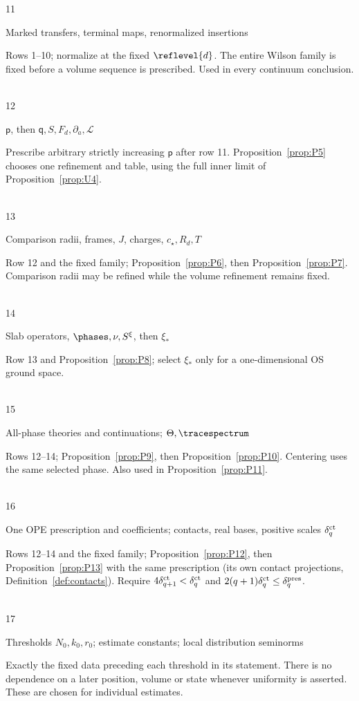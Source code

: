 \begin{tabbing}
11\>\parbox[t]{0.26\linewidth}{\raggedright Marked transfers, terminal maps, renormalized insertions}\>\parbox[t]{0.67\linewidth}{\raggedright Rows 1--10; normalize at the fixed $\reflevel{d}$. The entire Wilson family is fixed before a volume sequence is prescribed. Used in every continuum conclusion.}\\[0.45em]
12\>\parbox[t]{0.26\linewidth}{\raggedright $\mathsf p$, then $\mathsf q,S,F_d,\partial_a,\mathcal L$}\>\parbox[t]{0.67\linewidth}{\raggedright Prescribe arbitrary strictly increasing $\mathsf p$ after row 11. Proposition~\ref{prop:P5} chooses one refinement and table, using the full inner limit of Proposition~\ref{prop:U4}.}\\[0.45em]
13\>\parbox[t]{0.26\linewidth}{\raggedright Comparison radii, frames, $J$, charges, $c_\star,R_d,T$}\>\parbox[t]{0.67\linewidth}{\raggedright Row 12 and the fixed family; Proposition~\ref{prop:P6}, then Proposition~\ref{prop:P7}. Comparison radii may be refined while the volume refinement remains fixed.}\\[0.45em]
14\>\parbox[t]{0.26\linewidth}{\raggedright Slab operators, $\phases,\nu,S^\xi$, then $\xi_*$}\>\parbox[t]{0.67\linewidth}{\raggedright Row 13 and Proposition~\ref{prop:P8}; select $\xi_*$ only for a one-dimensional OS ground space.}\\[0.45em]
15\>\parbox[t]{0.26\linewidth}{\raggedright All-phase theories and continuations; $\Theta,\tracespectrum$}\>\parbox[t]{0.67\linewidth}{\raggedright Rows 12--14; Proposition~\ref{prop:P9}, then Proposition~\ref{prop:P10}. Centering uses the same selected phase. Also used in Proposition~\ref{prop:P11}.}\\[0.45em]
16\>\parbox[t]{0.26\linewidth}{\raggedright One OPE prescription and coefficients; contacts, real bases, positive scales $\delta_q^{\rm ct}$}\>\parbox[t]{0.67\linewidth}{\raggedright Rows 12--14 and the fixed family; Proposition~\ref{prop:P12}, then Proposition~\ref{prop:P13} with the same prescription (its own contact projections, Definition~\ref{def:contacts}). Require $4\delta_{q+1}^{\rm ct}<\delta_q^{\rm ct}$ and $2(q+1)\delta_q^{\rm ct}\le\delta_q^{\rm pres}$.}\\[0.45em]
17\>\parbox[t]{0.26\linewidth}{\raggedright Thresholds $N_0,k_0,r_0$; estimate constants; local distribution seminorms}\>\parbox[t]{0.67\linewidth}{\raggedright Exactly the fixed data preceding each threshold in its statement. There is no dependence on a later position, volume or state whenever uniformity is asserted. These are chosen for individual estimates.}\\
\end{tabbing}
\endgroup

